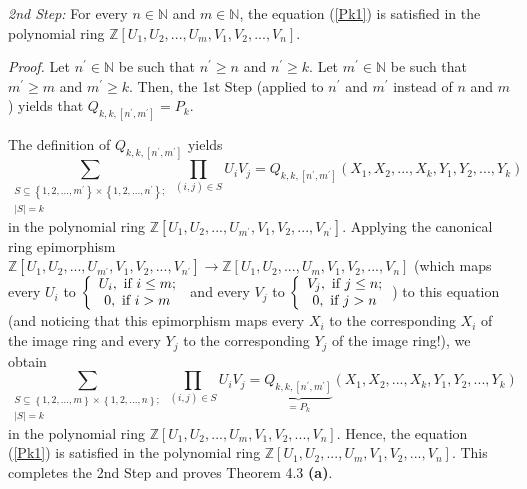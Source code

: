 \documentclass[12pt,final,notitlepage,onecolumn,german]{article}%
\begin{document}
\textit{2nd Step:} For every $n\in\mathbb{N}$ and $m\in\mathbb{N}$, the
equation (\ref{Pk1}) is satisfied in the polynomial ring $\mathbb{Z}\left[
U_{1},U_{2},...,U_{m},V_{1},V_{2},...,V_{n}\right]  $.

\textit{Proof.} Let $n^{\prime}\in\mathbb{N}$ be such that $n^{\prime}\geq n$
and $n^{\prime}\geq k$. Let $m^{\prime}\in\mathbb{N}$ be such that $m^{\prime
}\geq m$ and $m^{\prime}\geq k$. Then, the 1st Step (applied to $n^{\prime}$
and $m^{\prime}$ instead of $n$ and $m$) yields that $Q_{k,k,\left[
n^{\prime},m^{\prime}\right]  }=P_{k}.$

The definition of $Q_{k,k,\left[  n^{\prime},m^{\prime}\right]  }$ yields
\[
\sum_{\substack{S\subseteq\left\{  1,2,...,m^{\prime}\right\}  \times\left\{
1,2,...,n^{\prime}\right\}  ;\\\left\vert S\right\vert =k}}\prod_{\left(
i,j\right)  \in S}U_{i}V_{j}=Q_{k,k,\left[  n^{\prime},m^{\prime}\right]
}\left(  X_{1},X_{2},...,X_{k},Y_{1},Y_{2},...,Y_{k}\right)
\]
in the polynomial ring $\mathbb{Z}\left[  U_{1},U_{2},...,U_{m^{\prime}}%
,V_{1},V_{2},...,V_{n^{\prime}}\right]  $. Applying the canonical ring
epimorphism $\mathbb{Z}\left[  U_{1},U_{2},...,U_{m^{\prime}},V_{1}%
,V_{2},...,V_{n^{\prime}}\right]  \rightarrow\mathbb{Z}\left[  U_{1}%
,U_{2},...,U_{m},V_{1},V_{2},...,V_{n}\right]  $ (which maps every $U_{i}$ to
$\left\{
\begin{array}
[c]{c}%
U_{i},\text{ if }i\leq m;\\
0,\text{ if }i>m
\end{array}
\right.  $ and every $V_{j}$ to $\left\{
\begin{array}
[c]{c}%
V_{j},\text{ if }j\leq n;\\
0,\text{ if }j>n
\end{array}
\right.  $) to this equation (and noticing that this epimorphism maps every
$X_{i}$ to the corresponding $X_{i}$ of the image ring and every $Y_{j}$ to
the corresponding $Y_{j}$ of the image ring!), we obtain%
\[
\sum_{\substack{S\subseteq\left\{  1,2,...,m\right\}  \times\left\{
1,2,...,n\right\}  ;\\\left\vert S\right\vert =k}}\prod_{\left(  i,j\right)
\in S}U_{i}V_{j}=\underbrace{Q_{k,k,\left[  n^{\prime},m^{\prime}\right]  }%
}_{=P_{k}}\left(  X_{1},X_{2},...,X_{k},Y_{1},Y_{2},...,Y_{k}\right)
\]
in the polynomial ring $\mathbb{Z}\left[  U_{1},U_{2},...,U_{m},V_{1}%
,V_{2},...,V_{n}\right]  $. Hence, the equation (\ref{Pk1}) is satisfied in
the polynomial ring $\mathbb{Z}\left[  U_{1},U_{2},...,U_{m},V_{1}%
,V_{2},...,V_{n}\right]  .$ This completes the 2nd Step and proves Theorem 4.3
\textbf{(a)}.
\end{document}
